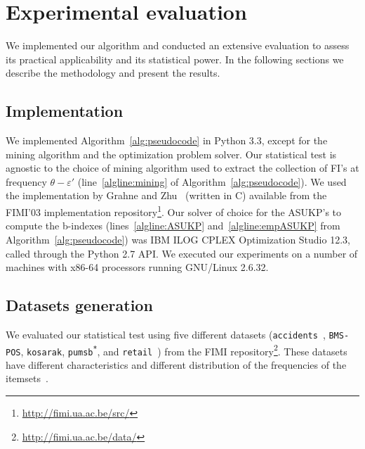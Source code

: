 
\section{Experimental evaluation}\label{sec:experiments}
We implemented our algorithm and conducted an extensive evaluation to assess its
practical applicability and its statistical power. In the following sections we
describe the methodology and present the results.

\subsection{Implementation}\label{sec:implementation}
We implemented Algorithm~\ref{alg:pseudocode} in Python 3.3, except for the
mining algorithm and the optimization problem solver. Our statistical test is
agnostic to the choice of mining algorithm used to extract the collection of
FI's at frequency $\theta-\varepsilon'$ (line~\ref{algline:mining} of
Algorithm~\ref{alg:pseudocode}). We used the implementation by Grahne and
Zhu~\citep{GrahneZ03} (written in C) available from the FIMI'03 implementation
repository\footnote{\url{http://fimi.ua.ac.be/src/}}. Our solver of choice for
the ASUKP's to compute the b-indexes (lines~\ref{algline:ASUKP} and~\ref{algline:empASUKP} from Algorithm~\ref{alg:pseudocode}) was
IBM\textsuperscript{\textregistered} ILOG\textsuperscript{\textregistered}
CPLEX\textsuperscript{\textregistered} Optimization Studio 12.3, called through
the Python 2.7 API. We executed our experiments on a number of machines with
x86-64 processors running GNU/Linux 2.6.32.

\subsection{Datasets generation}\label{sec:dsgen}
\sloppy
We evaluated our statistical test using five different datasets
(\texttt{accidents}~\citep{GeurtsWBV03}, \texttt{BMS-POS}, \texttt{kosarak},
\texttt{pumsb\textsuperscript{*}}, and \texttt{retail}~\citep{BrijsSVW99}) from the FIMI
repository\footnote{\url{http://fimi.ua.ac.be/data/}}. These datasets have
different characteristics and different distribution of the frequencies of the
itemsets~\cite{GoethalsZ04}.

